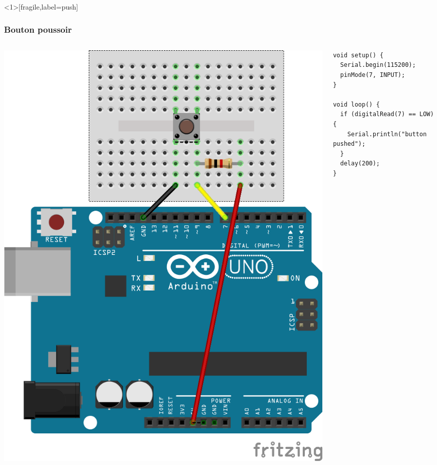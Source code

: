 \documentclass[aspectratio=169,utf8,french]{beamer}
\begin{document}
\begin{frame}<1>[fragile,label=push]
  \frametitle{Bouton poussoir}
  \begin{columns}
    \begin{column}{.5\linewidth}
      \includegraphics[height=.8\textheight]{pictures/UNO-push_bb.png}
    \end{column}
    \pause
    \begin{column}{.5\linewidth}
      \begin{lstlisting}
void setup() {
  Serial.begin(115200);
  pinMode(7, INPUT);
}

void loop() {
  if (digitalRead(7) == LOW) {
    Serial.println("button pushed");
  }
  delay(200);
}
      \end{lstlisting}
    \end{column}
  \end{columns}
\end{frame}

\end{document}
